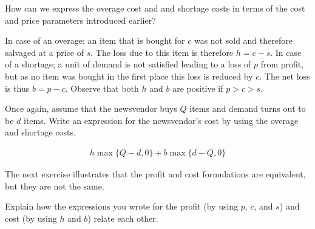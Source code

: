 \begin{question}
How can we express the overage cost and and shortage costs in terms of the cost and price parameters introduced earlier?
\end{question}

\begin{solution}
In case of an overage; an item that is bought for $c$ was not sold and therefore salvaged at a price of $s$. The loss due to this item is therefore $h=c-s$. In case of a shortage; a unit of demand is not satisfied leading to a loss of $p$ from profit, but as no item was bought in the first place this loss is reduced by $c$. The net loss is thus $b=p-c$. Observe that both $h$ and $b$ are positive if $p>c>s$.
\end{solution}

\begin{question}
Once again, assume that the newsvendor buys $Q$ items and demand turns out to be $d$ items. Write an expression for the newsvendor's cost by using the overage and shortage costs.
\end{question}

\begin{solution}
\begin{align*}
h\max\{Q-d,0\} + b\max\{d-Q,0\}
\end{align*}
\end{solution}

The next exercise illustrates that the profit and cost formulations are equivalent, but they are not the same.

\begin{question}
Explain how the expressions you wrote for the profit (by using $p$, $c$, and $s$) and cost (by using $h$ and $b$) relate each other.
\end{question}

